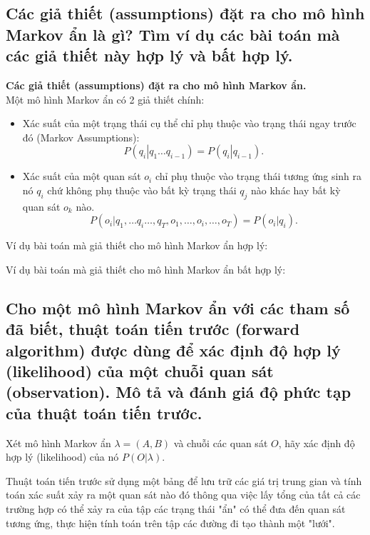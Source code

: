 \subsection{Các giả thiết (assumptions) đặt ra cho mô hình Markov ẩn là gì? Tìm ví dụ các bài toán mà các giả thiết này hợp lý và bất hợp lý.}
\textbf{Các giả thiết (assumptions) đặt ra cho mô hình Markov ẩn.}\\
Một mô hình Markov ẩn có 2 giả thiết chính:
\begin{itemize}
\item Xác suất của một trạng thái cụ thể chỉ phụ thuộc vào trạng thái ngay trước đó (Markov Assumptions):
\begin{equation}
 P\left({\left. {{q_i}} \right|{q_1} \ldots {q_{i - 1}}} \right) = P\left( {\left. {{q_i}} \right|{q_{i - 1}}} \right).
\end{equation}

\item Xác suất của một quan sát \(o_i\) chỉ phụ thuộc vào trạng thái tương ứng sinh ra nó \(q_i\) chứ không phụ thuộc vào bất kỳ trạng thái \(q_j\) nào khác hay bất kỳ quan sát \(o_k\) nào.
\begin{equation}
P\left({\left. {{o_i}} \right|{q_1}, \ldots {q_{i}}\ldots ,q_T,o_1,\ldots,o_i,\ldots,o_T} \right) = P\left( {\left. {{o_i}} \right|{q_i}} \right).
\end{equation}

\end{itemize}

Ví dụ bài toán mà giả thiết cho mô hình Markov ẩn hợp lý:

Ví dụ bài toán mà giả thiết cho mô hình Markov ẩn bất hợp lý:

\subsection{Cho một mô hình Markov ẩn với các tham số đã biết, thuật toán tiến trước (forward algorithm) được dùng để xác định độ hợp lý (likelihood) của một chuỗi quan sát (observation). Mô tả và đánh giá độ phức tạp của thuật toán tiến trước.}

Xét mô hình Markov ẩn \(\lambda = (A,B)\) và chuỗi các quan sát \(O\), hãy xác định độ hợp lý (likelihood) của nó \(P(O|\lambda)\).

Thuật toán tiến trước sử dụng một bảng để lưu trữ các giá trị trung gian và tính toán xác suất xảy ra một quan sát nào đó thông qua việc lấy tổng của tất cả các trường hợp có thể xảy ra của tập các trạng thái "ẩn" có thể đưa đến quan sát tương ứng, thực hiện tính toán trên tập các đường đi tạo thành một "lưới".

